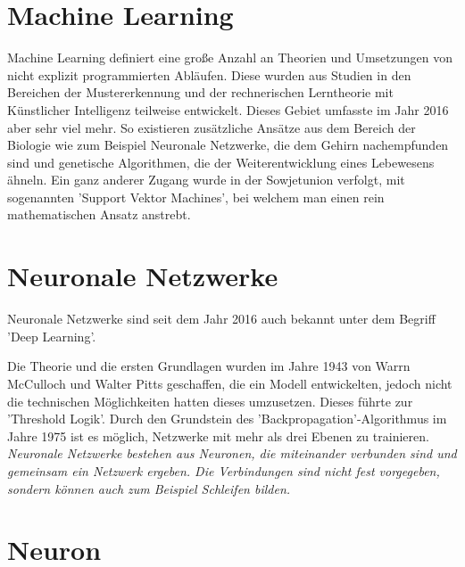 \section{Machine Learning}
\label{sec:Machine Learning}

Machine Learning definiert eine große Anzahl an Theorien und Umsetzungen von nicht explizit programmierten Abläufen. 
Diese wurden aus Studien in den Bereichen der Mustererkennung und der rechnerischen Lerntheorie mit Künstlicher Intelligenz teilweise entwickelt. 
Dieses Gebiet umfasste im Jahr 2016 aber sehr viel mehr. 
So existieren zusätzliche Ansätze aus dem Bereich der Biologie wie zum Beispiel Neuronale Netzwerke, die dem Gehirn nachempfunden sind und genetische Algorithmen, die der Weiterentwicklung eines Lebewesens ähneln. 
Ein ganz anderer Zugang wurde in der Sowjetunion verfolgt, mit sogenannten 'Support Vektor Machines', bei welchem man einen rein mathematischen Ansatz anstrebt. \cite{lampropoulos2015machine}

\section{Neuronale Netzwerke}

Neuronale Netzwerke sind seit dem Jahr 2016 auch bekannt unter dem Begriff 'Deep Learning'. \newline

\noindent 
Die Theorie und die ersten Grundlagen wurden im Jahre 1943 von Warrn McCulloch und Walter Pitts geschaffen, die ein Modell entwickelten, jedoch nicht die technischen Möglichkeiten hatten dieses umzusetzen.
Dieses %
führte zur 'Threshold Logik'. 
Durch den Grundstein des 'Backpropagation'-Algorithmus im Jahre 1975 ist es möglich, Netzwerke mit mehr als drei Ebenen zu trainieren. \\

\noindent 
\textit{
Neuronale Netzwerke bestehen aus Neuronen, die miteinander verbunden sind und gemeinsam ein Netzwerk ergeben.%
Die Verbindungen sind nicht fest vorgegeben, sondern können auch zum Beispiel Schleifen bilden.}

\cite{AI3}

\section{Neuron}
\label{sec:Neuron}

